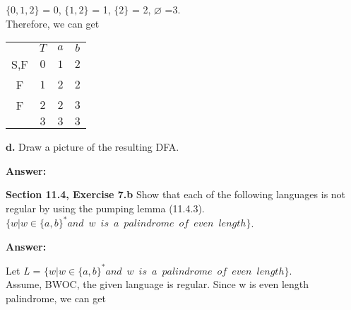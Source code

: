 \documentclass[12pt]{article}
\begin{document}
$\{0, 1, 2\}$ = 0, $\{1, 2\}$ = 1, $\{2\}$ = 2, $\varnothing$ =3. \\ 
Therefore, we can get

\begin{center}
\hspace{0.5cm}
\begin{tabular}{cc|cc}
           & $T$   & $a$  & $b$ \\
     \cline{2-4}
     S,F   & $0$   & $1$  & $2$ \\
     F     & $1$   & $2$  & $2$ \\
     F     & $2$   & $2$  & $3$ \\
           & $3$   & $3$  & $3$ \\
\end{tabular}
\end{center}

\textbf{d.} Draw a picture of the resulting DFA.

\textbf{Answer:}


\textbf{Section 11.4, Exercise 7.b} Show that each of the following languages is not regular by using the
pumping lemma (11.4.3). \\
$\{w | w \in \{a, b\}^* and \enspace w \enspace is \enspace a \enspace palindrome \enspace of \enspace 
even \enspace length\}$.

\textbf{Answer:}

Let \textit{L} = $\{w | w \in \{a, b\}^* and \enspace w \enspace is \enspace a \enspace palindrome \enspace of \enspace 
even \enspace length\}$. \\
Assume, BWOC, the given language is regular. Since w is even length palindrome, we can get 
\end{document}
